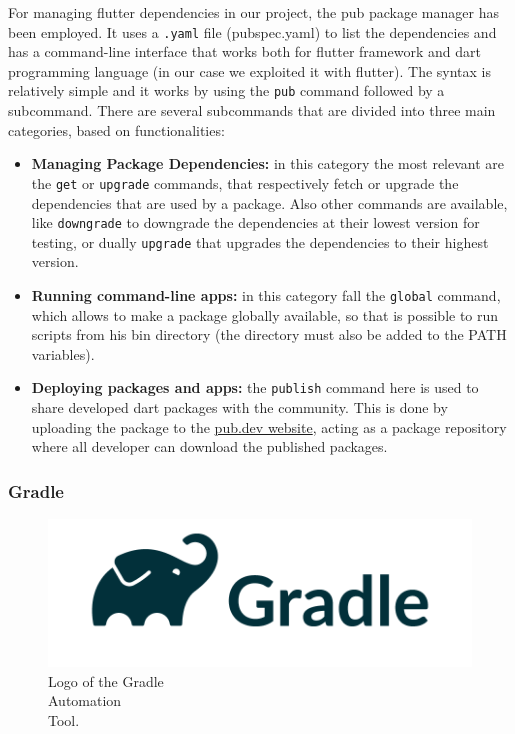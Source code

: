 For managing flutter dependencies in our project, the pub package manager has been employed. It uses a \texttt{.yaml} file (pubspec.yaml) to list the dependencies and has a command-line interface that works both for flutter framework and dart programming language (in our case we exploited it with flutter). The syntax is relatively simple and it works by using the \texttt{pub} command followed by a subcommand. \newline There are several subcommands that are divided into three main categories, based on functionalities\cite{Pub}:
\vspace{3ex}
\begin{itemize}[nosep]
    \item \textbf{Managing Package Dependencies:} in this category the most relevant are the \texttt{get} or \texttt{upgrade} commands, that respectively fetch or upgrade the dependencies that are used by a package. Also other commands are available, like \texttt{downgrade} to downgrade the dependencies at their lowest version for testing, or dually \texttt{upgrade} that upgrades the dependencies to their highest version. 
    \item \textbf{Running command-line apps:} in this category fall the \texttt{global} command, which allows to make a package globally available, so that is possible to run scripts from his bin directory (the directory must also be added to the PATH variables).
    \item \textbf{Deploying packages and apps:} the \texttt{publish} command here is used to share developed dart packages with the community. This is done by uploading the package to the \href{https://pub.dev/}{pub.dev website}, acting as a package repository where all developer can download the published packages. 
\end{itemize}

\newpage
\subsubsection{Gradle}
\label{subsubsec:gradle}

\begin{figure} %
    \captionsetup{font=footnotesize}
    \centering
    \includegraphics[width=\linewidth]{images/gradle.png}
    \caption{Logo of the Gradle\\Automation\\Tool.}
\end{figure}


